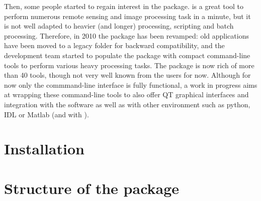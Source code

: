 Then, some people started to regain interest in the \app package. \mon
is a great tool to perform numerous remote sensing and image
processing task in a minute, but it is not well adapted to heavier
(and longer) processing, scripting and batch processing. Therefore, in
2010 the \app package has been revamped: old applications have been
moved to a legacy folder for backward compatibility, and the
development team started to populate the package with compact
command-line tools to perform various heavy processing tasks. The
package is now rich of more than 40 tools, though not very well known
from the users for now. Although for now only the commmand-line
interface is fully functional, a work in progress aims at wrapping these
command-line tools to also offer QT graphical interfaces and integration
with the \qgis software as well as with other environment such as python,
IDL or Matlab (and with \mont).

\section{Installation}\label{sec:appinstall}


\section{Structure of the package}\label{sec:appstruct}
